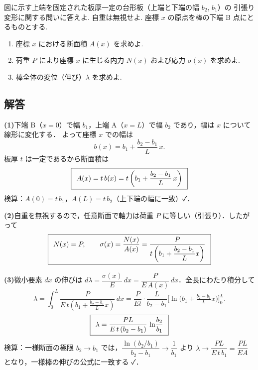 \documentclass[11pt,a4paper]{article}
\begin{document}
図に示す上端を固定された板厚一定の台形板（上端と下端の幅 $b_2$, $b_1$）の
引張り変形に関する問いに答えよ. 自重は無視せよ. 座標 $x$ の原点を棒の下端 B 点にとるものとする.

\begin{center}
\end{center}

\begin{enumerate}[label=(\arabic*)]
  \item 座標 $x$ における断面積 $A(x)$ を求めよ.
  \item 荷重 $P$ により座標 $x$ に生じる内力 $N(x)$ および応力 $\sigma(x)$ を求めよ.
  \item 棒全体の変位（伸び）$\lambda$ を求めよ.
\end{enumerate}

\subsection*{解答}

\noindent\textbf{(1)}\quad 下端 B（$x=0$）で幅 $b_1$，上端 A（$x=L$）で幅 $b_2$ であり，幅は $x$ について線形に変化する．
よって座標 $x$ での幅は
\[
  b(x) = b_1 + \frac{b_2-b_1}{L}\,x.
\]
板厚 $t$ は一定であるから断面積は
\[
  \boxed{\,\;A(x) = t\,b(x) = t\left(b_1 + \frac{b_2-b_1}{L}\,x\right)\;\,}
\]
検算：$A(0)=t\,b_1$，$A(L)=t\,b_2$（上下端の幅に一致）✓．

\medskip
\noindent\textbf{(2)}\quad 自重を無視するので，任意断面で軸力は荷重 $P$ に等しい（引張り）．したがって
\[
  \boxed{\,\;N(x) = P,\qquad \sigma(x) = \frac{N(x)}{A(x)} = \frac{P}{t\left(b_1 + \dfrac{b_2-b_1}{L}x\right)}\;\,}
\]

\medskip
\noindent\textbf{(3)}\quad 微小要素 $dx$ の伸びは $d\lambda = \dfrac{\sigma(x)}{E}\,dx = \dfrac{P}{E\,A(x)}\,dx$．全長にわたり積分して
\[
  \lambda = \int_0^L \frac{P}{E\,t\!\left(b_1 + \frac{b_2-b_1}{L}x\right)}\,dx
         = \frac{P}{Et}\cdot\frac{L}{b_2-b_1}\Big[\ln\!\big(b_1 + \tfrac{b_2-b_1}{L}x\big)\Big]_0^L .
\]
\[
  \boxed{\,\;\lambda = \frac{PL}{E\,t\,(b_2-b_1)}\,\ln\!\frac{b_2}{b_1}\;\,}
\]
検算：一様断面の極限 $b_2\to b_1$ では，$\dfrac{\ln(b_2/b_1)}{b_2-b_1}\to \dfrac{1}{b_1}$ より
$\lambda\to \dfrac{PL}{E\,t\,b_1}=\dfrac{PL}{EA}$ となり，一様棒の伸びの公式に一致する ✓．
\end{document}
